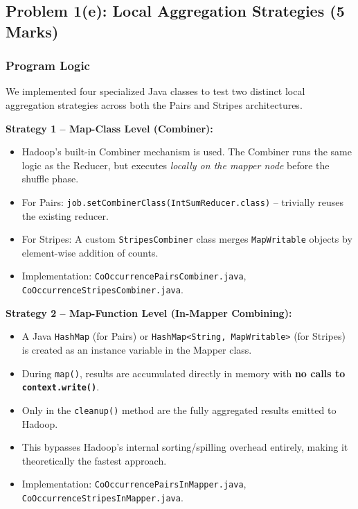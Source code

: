 \documentclass[12pt,a4paper]{article}
\begin{document}
\subsection{Problem 1(e): Local Aggregation Strategies (5 Marks)}

\subsubsection{Program Logic}
We implemented four specialized Java classes to test two distinct local aggregation strategies across both the Pairs and Stripes architectures.

\textbf{Strategy 1 -- Map-Class Level (Combiner):}
\begin{itemize}
  \item Hadoop's built-in Combiner mechanism is used. The Combiner runs the same logic as the Reducer, but executes \emph{locally on the mapper node} before the shuffle phase.
  \item For Pairs: \texttt{job.setCombinerClass(IntSumReducer.class)} -- trivially reuses the existing reducer.
  \item For Stripes: A custom \texttt{StripesCombiner} class merges \texttt{MapWritable} objects by element-wise addition of counts.
  \item Implementation: \texttt{CoOccurrencePairsCombiner.java}, \texttt{CoOccurrenceStripesCombiner.java}.
\end{itemize}

\textbf{Strategy 2 -- Map-Function Level (In-Mapper Combining):}
\begin{itemize}
  \item A Java \texttt{HashMap} (for Pairs) or \texttt{HashMap<String, MapWritable>} (for Stripes) is created as an instance variable in the Mapper class.
  \item During \texttt{map()}, results are accumulated directly in memory with \textbf{no calls to \texttt{context.write()}}.
  \item Only in the \texttt{cleanup()} method are the fully aggregated results emitted to Hadoop.
  \item This bypasses Hadoop's internal sorting/spilling overhead entirely, making it theoretically the fastest approach.
  \item Implementation: \texttt{CoOccurrencePairsInMapper.java}, \texttt{CoOccurrenceStripesInMapper.java}.
\end{itemize}
\end{document}
